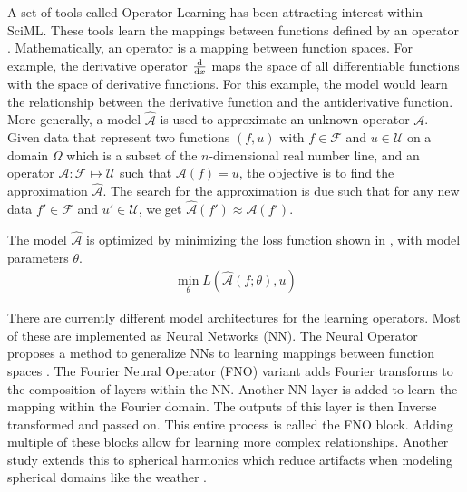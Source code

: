 A set of tools called Operator Learning has been attracting interest within SciML\@. These tools learn the mappings between functions defined by an operator \autocite{JMLR:v24:21-1524,boulleMathematicalGuideOperator2024}. Mathematically, an operator is a mapping between function spaces. For example, the derivative operator \(\dv{x}\) maps the space of all differentiable functions with the space of derivative functions. For this example, the model would learn the relationship between the derivative function and the antiderivative function. More generally, a model \(\hat{\mathcal{A}}\) is used to approximate an unknown operator \(\mathcal{A}\). Given data that represent two functions \((f,u)\) with \(f\in\mathcal{F}\) and \(u\in\mathcal{U}\) on a domain \(\Omega{}\) which is a subset of the \(n\)-dimensional real number line, and an operator \(\mathcal{A}:\mathcal{F}\mapsto\mathcal{U}\) such that \(\mathcal{A}(f)=u\), the objective is to find the approximation \(\hat{\mathcal{A}}\). The search for the approximation is due such that for any new data \(f'\in\mathcal{F}\) and \(u'\in\mathcal{U}\), we get \(\hat{\mathcal{A}}(f')\approx\mathcal{A}(f')\).

The model \(\hat{\mathcal{A}}\) is optimized by minimizing the loss function shown in , with model parameters \(\theta{}\).
\begin{align}
  \min_{\theta} L\left(\hat{\mathcal{A}}\left(f;\theta\right),u\right)\label{eq:operator_learning_loss}
\end{align}

There are currently different model architectures for the learning operators. Most of these are implemented as Neural Networks (NN). The Neural Operator proposes a method to generalize NNs to learning mappings between function spaces \autocite{li2021fourier}. The Fourier Neural Operator (FNO) variant adds Fourier transforms to the composition of layers within the NN\@. Another NN layer is added to learn the mapping within the Fourier domain. The outputs of this layer is then Inverse transformed and passed on. This entire process is called the FNO block. Adding multiple of these blocks allow for learning more complex relationships. Another study extends this to spherical harmonics which reduce artifacts when modeling spherical domains like the weather \autocite{bonevSphericalFourierNeural2023}. %

